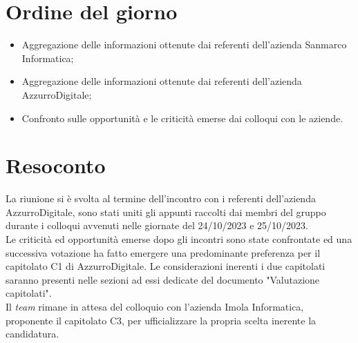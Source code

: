 \section{Ordine del giorno}
\begin{itemize}
    \item Aggregazione delle informazioni ottenute dai referenti dell'azienda Sanmarco Informatica;
    \item Aggregazione delle informazioni ottenute dai referenti dell'azienda AzzurroDigitale;
    \item Confronto sulle opportunità e le criticità emerse dai colloqui con le aziende.
\end{itemize}

\section{Resoconto}
La riunione si è svolta al termine dell'incontro con i referenti dell'azienda AzzurroDigitale, sono stati uniti gli appunti raccolti dai membri del gruppo durante i colloqui avvenuti nelle giornate del 24/10/2023 e 25/10/2023. \\

\noindent
Le criticità ed opportunità emerse dopo gli incontri sono state confrontate ed una successiva votazione ha fatto emergere una predominante preferenza per il capitolato C1 di AzzurroDigitale.
Le considerazioni inerenti i due capitolati saranno presenti nelle sezioni ad essi dedicate del documento "Valutazione capitolati". \\

\noindent
Il \textit{team} rimane in attesa del colloquio con l'azienda Imola Informatica, proponente il capitolato C3, per ufficializzare la propria scelta inerente la candidatura.

